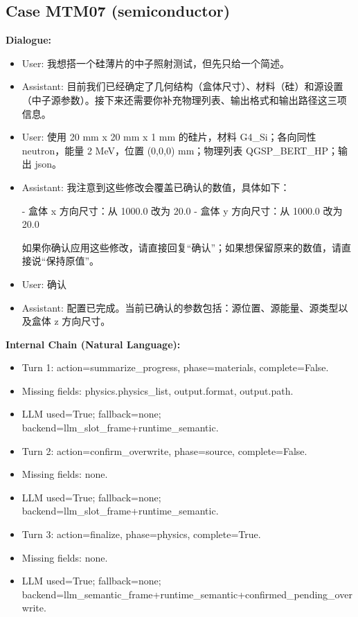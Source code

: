 \documentclass[11pt]{ctexart}
\begin{document}
\subsection{Case MTM07 (semiconductor)}
\textbf{Dialogue:}
\begin{itemize}
\item User: 我想搭一个硅薄片的中子照射测试，但先只给一个简述。
\item Assistant: 目前我们已经确定了几何结构（盒体尺寸）、材料（硅）和源设置（中子源参数）。接下来还需要你补充物理列表、输出格式和输出路径这三项信息。
\item User: 使用 20 mm x 20 mm x 1 mm 的硅片，材料 G4\_Si；各向同性 neutron，能量 2 MeV，位置 (0,0,0) mm；物理列表 QGSP\_BERT\_HP；输出 json。
\item Assistant: 我注意到这些修改会覆盖已确认的数值，具体如下：

- 盒体 x 方向尺寸：从 1000.0 改为 20.0
- 盒体 y 方向尺寸：从 1000.0 改为 20.0

如果你确认应用这些修改，请直接回复“确认”；如果想保留原来的数值，请直接说“保持原值”。
\item User: 确认
\item Assistant: 配置已完成。当前已确认的参数包括：源位置、源能量、源类型以及盒体 z 方向尺寸。
\end{itemize}
\textbf{Internal Chain (Natural Language):}
\begin{itemize}
\item Turn 1: action=summarize\_progress, phase=materials, complete=False.
\item Missing fields: physics.physics\_list, output.format, output.path.
\item LLM used=True; fallback=none; backend=llm\_slot\_frame+runtime\_semantic.
\item Turn 2: action=confirm\_overwrite, phase=source, complete=False.
\item Missing fields: none.
\item LLM used=True; fallback=none; backend=llm\_slot\_frame+runtime\_semantic.
\item Turn 3: action=finalize, phase=physics, complete=True.
\item Missing fields: none.
\item LLM used=True; fallback=none; backend=llm\_semantic\_frame+runtime\_semantic+confirmed\_pending\_overwrite.
\end{itemize}
\end{document}
